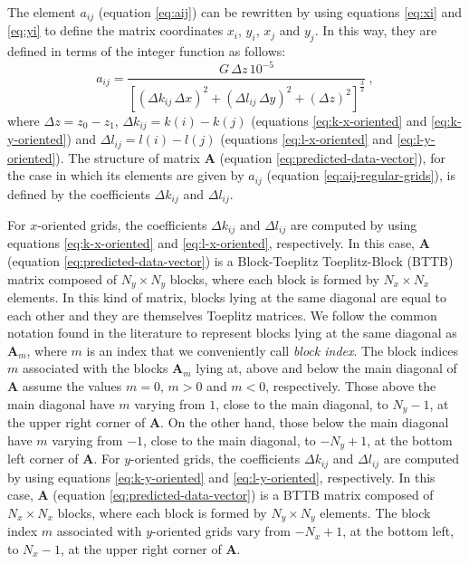 \documentclass[manuscript,revised]{geophysics}
\begin{document}
The element $a_{ij}$ (equation \ref{eq:aij}) can be rewritten by using equations 
\ref{eq:xi} and \ref{eq:yi} to define the matrix coordinates
$x_{i}$, $y_{i}$, $x_{j}$ and $y_{j}$. 
In this way, they are defined in terms of the integer function as follows:
\begin{equation}
a_{ij} = \frac{G \, \Delta z \, 10^{-5}}{ \left[ 
\left( \Delta k_{ij} \, \Delta x \right)^{2} + 
\left( \Delta l_{ij} \, \Delta y \right)^{2} + 
\left( \Delta z \right)^{2} \right]^{\frac{3}{2}}} \: ,
\label{eq:aij-regular-grids}
\end{equation}
where $\Delta z = z_{0} - z_{1}$, 
$\Delta k_{ij} = k(i) - k(j)$ (equations \ref{eq:k-x-oriented} and \ref{eq:k-y-oriented}) and
$\Delta l_{ij} = l(i) - l(j)$ (equations \ref{eq:l-x-oriented} and \ref{eq:l-y-oriented}).
The structure of matrix $\mathbf{A}$ (equation \ref{eq:predicted-data-vector}), for the case 
in which its elements are given by $a_{ij}$ (equation \ref{eq:aij-regular-grids}), is defined 
by the coefficients $\Delta k_{ij}$ and $\Delta l_{ij}$.

For $x$-oriented grids, the coefficients $\Delta k_{ij}$ and $\Delta l_{ij}$ are 
computed by using equations \ref{eq:k-x-oriented} and \ref{eq:l-x-oriented}, respectively.
In this case, $\mathbf{A}$ (equation \ref{eq:predicted-data-vector}) is a 
Block-Toeplitz Toeplitz-Block (BTTB) matrix \citep[][ p. 67]{chan-jin2007}
composed of $N_{y} \times N_{y}$ blocks, where each block is formed by 
$N_{x} \times N_{x}$ elements.
In this kind of matrix, blocks lying at the same diagonal are equal to each other
and they are themselves Toeplitz matrices.
We follow the common notation found in the literature to represent 
blocks lying at the same diagonal as $\mathbf{A}_{m}$, where $m$ is an
index that we conveniently call \textit{block index}.
The block indices $m$ associated with the blocks $\mathbf{A}_{m}$ lying at, above 
and below the main diagonal of $\mathbf{A}$ assume the values $m = 0$, $m > 0$ and $m < 0$,
respectively.
Those above the main diagonal have $m$ varying from $1$, close to the main diagonal, 
to $N_{y} - 1$, at the upper right corner of $\mathbf{A}$.
On the other hand, those below the main diagonal have $m$ 
varying from $-1$, close to the main diagonal, 
to $-N_{y} + 1$, at the bottom left corner of $\mathbf{A}$.
For $y$-oriented grids, the coefficients $\Delta k_{ij}$ and $\Delta l_{ij}$ are 
computed by using equations \ref{eq:k-y-oriented} and \ref{eq:l-y-oriented}, respectively.
In this case, $\mathbf{A}$ (equation \ref{eq:predicted-data-vector}) is a 
BTTB matrix composed of $N_{x} \times N_{x}$ blocks, where each block is formed by 
$N_{y} \times N_{y}$ elements.
The block index $m$ associated with $y$-oriented grids vary from $-N_{x} + 1$,
at the bottom left, to $N_{x} - 1$, at the upper right corner of $\mathbf{A}$.
\end{document}
